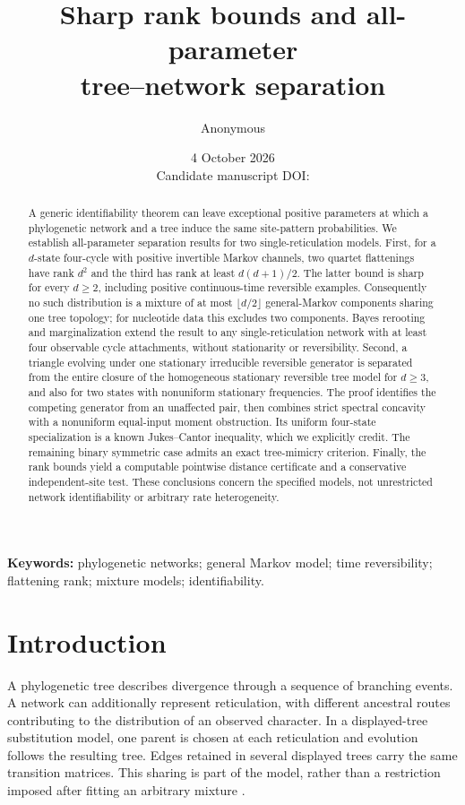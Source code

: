 \documentclass[11pt]{article}
\title{Sharp rank bounds and all-parameter\\tree--network separation}
\author{Anonymous}
\date{4 October 2026\\\small Candidate manuscript \quad DOI: \ReleaseDOI}
\theoremstyle{definition}
\theoremstyle{remark}
\begin{document}
\maketitle
\begin{abstract}
A generic identifiability theorem can leave exceptional positive parameters at
which a phylogenetic network and a tree induce the same site-pattern
probabilities. We establish all-parameter separation results for two
single-reticulation models. First, for a $d$-state four-cycle with positive
invertible Markov channels, two quartet flattenings have rank $d^2$ and the
third has rank at least $d(d+1)/2$. The latter bound is sharp for every $d\ge2$,
including positive continuous-time reversible examples. Consequently no such
distribution is a mixture of at most $\lfloor d/2\rfloor$ general-Markov
components sharing one tree topology; for nucleotide data this excludes two
components. Bayes rerooting and marginalization extend the result to any
single-reticulation network with at least four observable cycle attachments,
without stationarity or reversibility. Second, a triangle evolving under one
stationary irreducible reversible generator is separated from the entire
closure of the homogeneous stationary reversible tree model for $d\ge3$,
and also for two states with nonuniform stationary frequencies. The proof
identifies the competing generator from an unaffected pair, then combines
strict spectral concavity with a nonuniform equal-input moment obstruction.
Its uniform four-state specialization is a known Jukes--Cantor inequality,
which we explicitly credit. The remaining binary symmetric case admits an
exact tree-mimicry criterion. Finally, the rank bounds yield a computable
pointwise distance certificate and a conservative independent-site test.
These conclusions concern the specified models, not unrestricted network
identifiability or arbitrary rate heterogeneity.
\end{abstract}
\noindent\textbf{Keywords:} phylogenetic networks; general Markov model;
time reversibility; flattening rank; mixture models; identifiability.

\section{Introduction}

A phylogenetic tree describes divergence through a sequence of branching
events. A network can additionally represent reticulation, with different
ancestral routes contributing to the distribution of an observed character.
In a displayed-tree substitution model, one parent is chosen at each
reticulation and evolution follows the resulting tree. Edges retained in
several displayed trees carry the same transition matrices. This sharing is
part of the model, rather than a restriction imposed after fitting an
arbitrary mixture \cite{Gross2021,Sullivant2026}.
\end{document}
